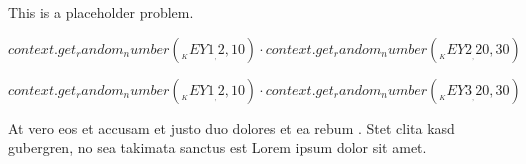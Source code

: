 This is a placeholder problem.
\begin{Problem}
\item ${{context.get_random_number(__KEY1__, 2, 10)}} \cdot {{context.get_random_number(__KEY2__, 20, 30)}}$
\item ${{context.get_random_number(__KEY1__, 2, 10)}} \cdot {{context.get_random_number(__KEY3__, 20, 30)}}$ 
\item At vero eos et accusam et justo duo dolores et ea rebum . Stet clita kasd gubergren, no sea takimata sanctus est Lorem ipsum dolor sit amet. 
\end{Problem}